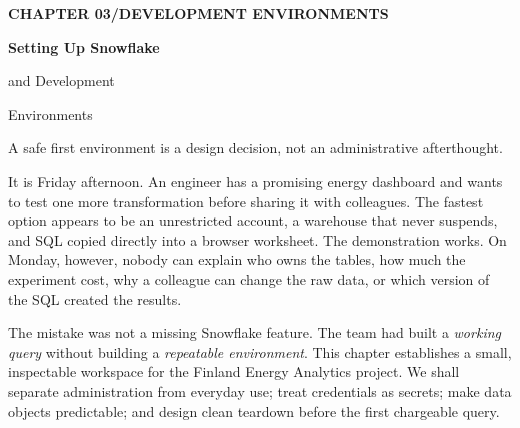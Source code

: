 \documentclass[11pt,twoside]{article}
\begin{document}
{\sffamily\bfseries\color{teal}\fontsize{10}{12}\selectfont CHAPTER 03\quad /\quad DEVELOPMENT ENVIRONMENTS}\par\vspace{2mm}
{\sffamily\bfseries\color{navy}\fontsize{23}{26}\selectfont Setting Up Snowflake\par and Development\par Environments}\par
\vspace{1.6mm}{\color{steelblue}\rule{\linewidth}{1.5pt}}\par\vspace{2mm}
{\sffamily\color{inkgray}\fontsize{11.2}{15}\selectfont A safe first environment is a design decision, not an administrative afterthought.}\par\vspace{2mm}

It is Friday afternoon. An engineer has a promising energy dashboard and wants to test one more transformation before sharing it with colleagues. The fastest option appears to be an unrestricted account, a warehouse that never suspends, and SQL copied directly into a browser worksheet. The demonstration works. On Monday, however, nobody can explain who owns the tables, how much the experiment cost, why a colleague can change the raw data, or which version of the SQL created the results.

The mistake was not a missing Snowflake feature. The team had built a \emph{working query} without building a \emph{repeatable environment}. This chapter establishes a small, inspectable workspace for the Finland Energy Analytics project. We shall separate administration from everyday use; treat credentials as secrets; make data objects predictable; and design clean teardown before the first chargeable query.
\end{document}
